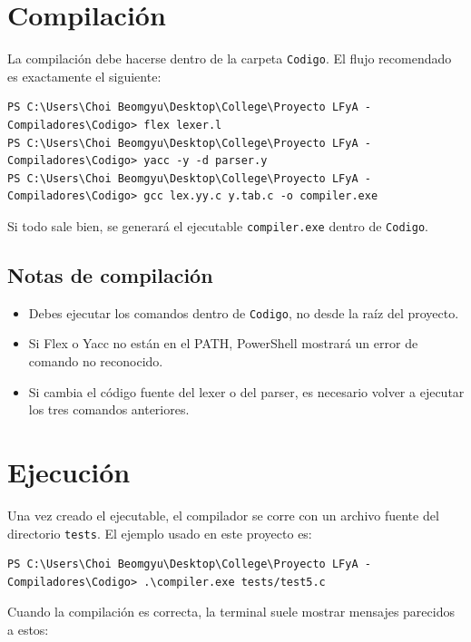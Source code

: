 \documentclass[12pt]{article}
\begin{document}
\section{Compilación}
La compilación debe hacerse dentro de la carpeta \texttt{Codigo}. El flujo recomendado es exactamente el siguiente:

\begin{lstlisting}[language={}, caption={Compilación del compilador en PowerShell}]
PS C:\Users\Choi Beomgyu\Desktop\College\Proyecto LFyA - Compiladores\Codigo> flex lexer.l
PS C:\Users\Choi Beomgyu\Desktop\College\Proyecto LFyA - Compiladores\Codigo> yacc -y -d parser.y
PS C:\Users\Choi Beomgyu\Desktop\College\Proyecto LFyA - Compiladores\Codigo> gcc lex.yy.c y.tab.c -o compiler.exe
\end{lstlisting}

Si todo sale bien, se generará el ejecutable \texttt{compiler.exe} dentro de \texttt{Codigo}.

\subsection{Notas de compilación}
\begin{itemize}[label={-}]
    \item Debes ejecutar los comandos dentro de \texttt{Codigo}, no desde la raíz del proyecto.
    \item Si Flex o Yacc no están en el PATH, PowerShell mostrará un error de comando no reconocido.
    \item Si cambia el código fuente del lexer o del parser, es necesario volver a ejecutar los tres comandos anteriores.
\end{itemize}

\section{Ejecución}
Una vez creado el ejecutable, el compilador se corre con un archivo fuente del directorio \texttt{tests}. El ejemplo usado en este proyecto es:

\begin{lstlisting}[language={}, caption={Ejecución del compilador}]
PS C:\Users\Choi Beomgyu\Desktop\College\Proyecto LFyA - Compiladores\Codigo> .\compiler.exe tests/test5.c
\end{lstlisting}

Cuando la compilación es correcta, la terminal suele mostrar mensajes parecidos a estos:
\end{document}
